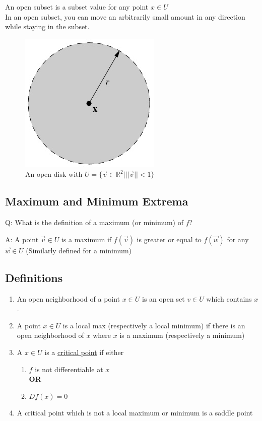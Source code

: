 \documentclass{article}
\begin{document}
An open subset is a subset value for any point $x\in U$ \\
In an open subset, you can move an arbitrarily small amount in any direction while staying in the subset.
\begin{figure}[h!]
    \centering
    \includegraphics[scale = .5]{OpenDisk.jpg}
    \caption{An open disk with $U=\{\vec{v}\in \mathbb{R}^2\Big| ||\vec{v}||<1\}$}
    \label{}
\end{figure}

\subsection*{Maximum and Minimum Extrema}
Q: What is the definition of a maximum (or minimum) of $f$?

A: A point $\vec{v}\in U$ is a maximum if $f(\vec{v})$ is greater or equal to $f(\vec{w})$ for any $\vec{w}\in U$ (Similarly defined for a minimum)

\subsection*{Definitions}
\begin{enumerate}
    \item An open neighborhood of a point $x\in U$ is an open set $v\in U$ which contains $x$.
    \item A point $x\in U$ is a local max (respectively a local minimum) if there is an open neighborhood of $x$ where $x$ is a maximum (respectively a minimum)
    \item A $x\in U$ is a \underline{critical point} if either
    \begin{enumerate}
        \item $f$ is not differentiable at $x$\\[5pt]
        \textbf{OR}
        \item $Df(x)=0$
    \end{enumerate}
    \item A critical point which is not a local maximum or minimum is a saddle point
\end{enumerate}
\end{document}
